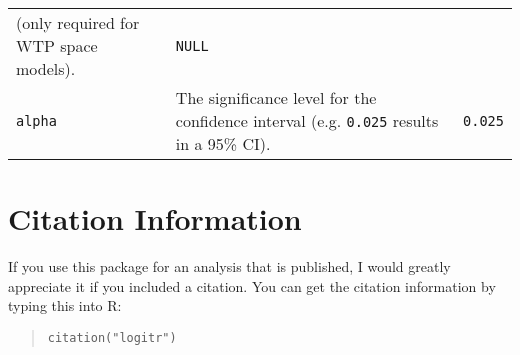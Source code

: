 \documentclass[article]{jss}
\begin{document}
\begin{longtable}[]{@{}lll@{}}
\begin{minipage}[t]{0.66\columnwidth}
(only required for WTP space models).\strut
\end{minipage} & \begin{minipage}[t]{0.11\columnwidth}\raggedright
\texttt{NULL}\strut
\end{minipage}\tabularnewline
\begin{minipage}[t]{0.14\columnwidth}\raggedright
\texttt{alpha}\strut
\end{minipage} & \begin{minipage}[t]{0.66\columnwidth}\raggedright
The significance level for the confidence interval (e.g. \texttt{0.025}
results in a 95\% CI).\strut
\end{minipage} & \begin{minipage}[t]{0.11\columnwidth}\raggedright
\texttt{0.025}\strut
\end{minipage}\tabularnewline
\bottomrule
\end{longtable}

\hypertarget{citation-information}{%
\section{Citation Information}\label{citation-information}}

If you use this package for an analysis that is published, I would
greatly appreciate it if you included a citation. You can get the
citation information by typing this into R:

\begin{quote}
\texttt{citation("logitr")}
\end{quote}


\end{document}
